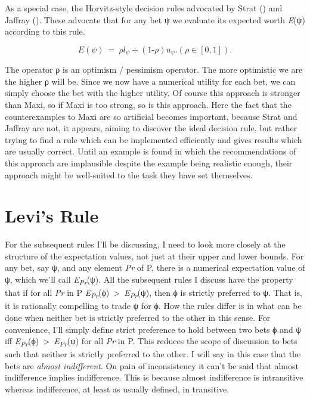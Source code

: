 \documentclass[
  11pt,
  letterpaper,
  DIV=11,
  numbers=noendperiod,
  twoside]{scrartcl}
\begin{document}
As a special case, the Horvitz-style decision rules advocated by Strat
() and Jaffray
(). These advocate that for any bet ψ we
evaluate its expected worth \emph{E}(ψ) according to this rule.

\[
E(\psi)~=~\rho l_\psi + (1‑ \rho)u_\psi. (\rho \in [0, 1]).
\]

The operator ρ is an optimism / pessimism operator. The more optimistic
we are the higher ρ will be. Since we now have a numerical utility for
each bet, we can simply choose the bet with the higher utility. Of
course this approach is stronger than Maxi, so if Maxi is too strong, so
is this approach. Here the fact that the counterexamples to Maxi are so
artificial becomes important, because Strat and Jaffray are not, it
appears, aiming to discover the ideal decision rule, but rather trying
to find a rule which can be implemented efficiently and gives results
which are usually correct. Until an example is found in which the
recommendations of this approach are implausible despite the example
being realistic enough, their approach might be well-suited to the task
they have set themselves.

\section{Levi's Rule}\label{levis-rule}

For the subsequent rules I'll be discussing, I need to look more closely
at the structure of the expectation values, not just at their upper and
lower bounds. For any bet, say ψ, and any element \emph{Pr} of P, there
is a numerical expectation value of ψ, which we'll call
\emph{E\textsubscript{Pr}}(ψ). All the subsequent rules I discuss have
the property that if for all \emph{Pr} in P
\emph{E\textsubscript{Pr}}(ϕ)~\textgreater~\emph{E\textsubscript{Pr}}(ψ),
then ϕ is strictly preferred to ψ. That is, it is rationally compelling
to trade ψ for ϕ. How the rules differ is in what can be done when
neither bet is strictly preferred to the other in this sense. For
convenience, I'll simply define strict preference to hold between two
bets ϕ and ψ iff
\emph{E\textsubscript{Pr}}(ϕ)~\textgreater~\emph{E\textsubscript{Pr}}(ψ)
for all \emph{Pr} in P. This reduces the scope of discussion to bets
such that neither is strictly preferred to the other. I will say in this
case that the bets are \emph{almost indifferent}. On pain of
inconsistency it can't be said that almost indifference implies
indifference. This is because almost indifference is intransitive
whereas indifference, at least as usually defined, in transitive.
\end{document}
